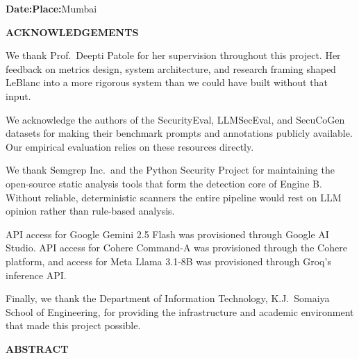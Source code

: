 \documentclass[12pt,a4paper]{report}
\begin{document}
\vspace{0.3in}
\noindent\textbf{Date:}\enspace\underline{\hspace{1.8in}}\hfill\textbf{Place:}\enspace Mumbai

\newpage
\thispagestyle{empty}
\begin{center}
  {\Large\bfseries ACKNOWLEDGEMENTS}
\end{center}

\vspace{0.25in}
\noindent We thank Prof.\ Deepti Patole for her supervision throughout this project.
Her feedback on metrics design, system architecture, and research framing shaped
LeBlanc into a more rigorous system than we could have built without that input.

\vspace{0.15in}
\noindent We acknowledge the authors of the SecurityEval, LLMSecEval, and SecuCoGen
datasets for making their benchmark prompts and annotations publicly available.
Our empirical evaluation relies on these resources directly.

\vspace{0.15in}
\noindent We thank Semgrep Inc.\ and the Python Security Project for maintaining
the open-source static analysis tools that form the detection core of Engine B.
Without reliable, deterministic scanners the entire pipeline would rest on LLM
opinion rather than rule-based analysis.

\vspace{0.15in}
\noindent API access for Google Gemini 2.5 Flash was provisioned through Google
AI Studio. API access for Cohere Command-A was provisioned through the Cohere
platform, and access for Meta Llama 3.1-8B was provisioned through Groq's
inference API.

\vspace{0.15in}
\noindent Finally, we thank the Department of Information Technology, K.J.\
Somaiya School of Engineering, for providing the infrastructure and academic
environment that made this project possible.

\newpage
\thispagestyle{empty}
\begin{center}
  {\Large\bfseries ABSTRACT}
\end{center}
\end{document}
